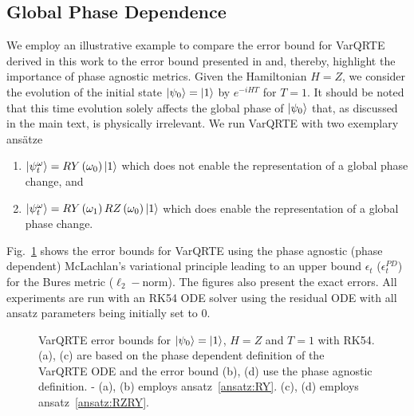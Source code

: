 \documentclass[twocolumn, aps, pra, superscriptaddress]{revtex4-1}
\begin{document}
\subsection{Global Phase Dependence}
\label{app:comparison}
We employ an illustrative example to compare the error bound for VarQRTE derived in this work to the error bound presented in \cite{MartinazzoErrorVarQuantumDyn20} and, thereby, highlight the importance of phase agnostic metrics.
Given the Hamiltonian $H=Z$, we consider the evolution of the initial state $\ket{\psi_0}=\ket{1}$ by $e^{-iHT}$ for $T=1$.
It should be noted that this time evolution solely affects the global phase of $\ket{\psi_0}$ that, as discussed in the main text, is physically irrelevant.
We run VarQRTE with two exemplary ans\"atze
\begin{enumerate}
\item $\ket{\psi_t^{\omega}}=RY\left(\omega_0\right)\ket{1}$ which does not enable the representation of a global phase change, and \label{ansatz:RY}
\item $\ket{\psi_t^{\omega}}=RY\left(\omega_1\right)RZ\left(\omega_0\right)\ket{1}$ which does enable the representation of a global phase change. \label{ansatz:RZRY}
\end{enumerate}
Fig.~\ref{fig:phase_fix_comp} shows the error bounds for VarQRTE using the phase agnostic (phase dependent) McLachlan's variational principle leading to an upper bound $\epsilon_t$ ($\epsilon^{PD}_t$) for the Bures metric ($\ell_2-$norm). The figures also present the exact errors.
All experiments are run with an RK54 ODE solver using the residual ODE with all ansatz parameters being initially set to $0$.
\begin{figure}[!hb]
    \centering
    \captionsetup{singlelinecheck = false, format= hang, justification=centerlast, font=footnotesize, labelsep=space}
    \caption{VarQRTE error bounds for $\ket{\psi_0}=\ket{1}$, $H=Z$ and $T=1$ with RK54. (a), (c) are based on the phase dependent definition of the VarQRTE ODE and the error bound  (b), (d) use the phase agnostic definition. - (a), (b) employs ansatz~\ref{ansatz:RY}. (c), (d) employs ansatz~\ref{ansatz:RZRY}.}
    \label{fig:phase_fix_comp}
\end{figure}
\end{document}
